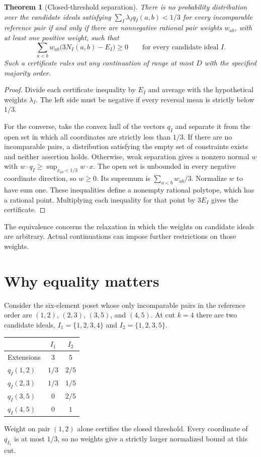\documentclass[11pt]{article}
\newtheorem{theorem}{Theorem}
\begin{document}
\begin{theorem}[Closed-threshold separation]
There is no probability distribution over the candidate ideals satisfying $\sum_I\lambda_I q_I(a,b)<1/3$ for every incomparable reference pair if and only if there are nonnegative rational pair weights $w_{ab}$, with at least one positive weight, such that
\[
 \sum_{a<b}w_{ab}\bigl(3N_I(a,b)-E_I\bigr)\ge0
 \qquad\text{for every candidate ideal }I.
\]
Such a certificate rules out any continuation of range at most $D$ with the specified majority order.
\end{theorem}
\begin{proof}
Divide each certificate inequality by $E_I$ and average with the hypothetical weights $\lambda_I$. The left side must be negative if every reversal mean is strictly below $1/3$.

For the converse, take the convex hull of the vectors $q_I$ and separate it from the open set in which all coordinates are strictly less than $1/3$. If there are no incomparable pairs, a distribution satisfying the empty set of constraints exists and neither assertion holds. Otherwise, weak separation gives a nonzero normal $w$ with $w\cdot q_I\ge\sup_{x_{ab}<1/3} w\cdot x$. The open set is unbounded in every negative coordinate direction, so $w\ge0$. Its supremum is $\sum_{a<b}w_{ab}/3$. Normalize $w$ to have sum one. These inequalities define a nonempty rational polytope, which has a rational point. Multiplying each inequality for that point by $3E_I$ gives the certificate.
\end{proof}

The equivalence concerns the relaxation in which the weights on candidate ideals are arbitrary. Actual continuations can impose further restrictions on those weights.

\section{Why equality matters}

Consider the six-element poset whose only incomparable pairs in the reference order are $(1,2)$, $(2,3)$, $(3,5)$, and $(4,5)$. At cut $k=4$ there are two candidate ideals, $I_1=\{1,2,3,4\}$ and $I_2=\{1,2,3,5\}$.
\begin{center}
\begin{tabular}{lcc}
\toprule
 & $I_1$ & $I_2$\\
\midrule
Extensions & $3$ & $5$\\
$q_I(1,2)$ & $1/3$ & $2/5$\\
$q_I(2,3)$ & $1/3$ & $1/5$\\
$q_I(3,5)$ & $0$ & $2/5$\\
$q_I(4,5)$ & $0$ & $1$\\
\bottomrule
\end{tabular}
\end{center}
Weight on pair $(1,2)$ alone certifies the closed threshold. Every coordinate of $q_{I_1}$ is at most $1/3$, so no weights give a strictly larger normalized bound at this cut.
\end{document}
